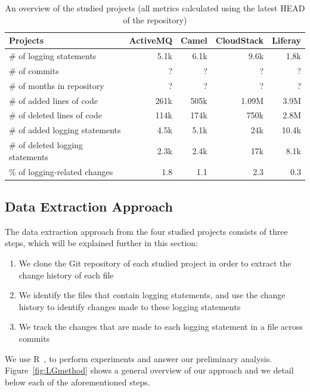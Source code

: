 \begin{table}[tb]
	\centering \protect\protect\caption{An overview of the studied projects (all metrics calculated using the latest HEAD of the repository) }
	\smaller
	
	\label{tba:overviewsystems} %
	\begin{tabular}{lrrrr}
		\toprule 
		Projects  & ActiveMQ  & Camel  & CloudStack  & Liferay \\
		\midrule
		\# of logging statements & 5.1k  & 6.1k  & 9.6k  & 1.8k \\
		\# of commits &	 ?  & ?  & ?  & ? \\	
		\# of months in repository &	 ?  & ?  & ?  & ? \\
		\midrule
		\# of added lines of code  & 261k  & 505k  & 1.09M  & 3.9M \\
		\# of deleted lines of code  & 114k  & 174k  & 750k  & 2.8M \\
		\# of added logging statements  & 4.5k  & 5.1k  & 24k  & 10.4k \\
		\# of deleted logging statements  & 2.3k & 2.4k  & 17k  & 8.1k \\
		\% of logging-related changes & 1.8 & 1.1 & 2.3 & 0.3 \\
		\bottomrule 
	\end{tabular}
\end{table}

\subsection{Data Extraction Approach}

The data extraction approach from the four studied projects consists of three steps, which will be explained further in this section: 

\begin{enumerate}
\item We clone the Git repository of each studied project in order to extract the change history of each file 
\item We identify the files that contain logging statements, and use the change history to identify changes made to these logging statements
\item We track the changes that are made to each logging statement in a file across commits 
\end{enumerate}

We use R~\cite{ihaka1996r}, to perform experiments and answer our preliminary analysis. Figure~\ref{fig:LGmethod} shows a general overview of our approach and we detail below each of the aforementioned steps. 

